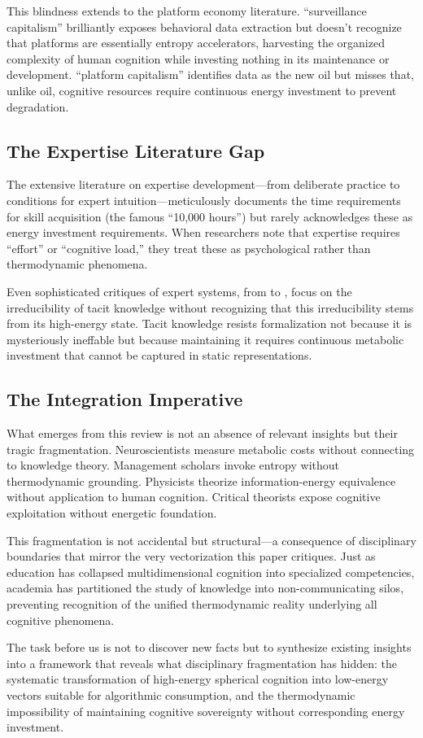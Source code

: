 This blindness extends to the platform economy literature. \citet{zuboff2019} ``surveillance capitalism'' brilliantly exposes behavioral data extraction but doesn't recognize that platforms are essentially entropy accelerators, harvesting the organized complexity of human cognition while investing nothing in its maintenance or development. \citet{srnicek2017} ``platform capitalism'' identifies data as the new oil but misses that, unlike oil, cognitive resources require continuous energy investment to prevent degradation.

\subsection{The Expertise Literature Gap}

The extensive literature on expertise development---from \citet{ericsson2006} deliberate practice to \citet{kahneman2009} conditions for expert intuition---meticulously documents the time requirements for skill acquisition (the famous ``10,000 hours'') but rarely acknowledges these as energy investment requirements. When researchers note that expertise requires ``effort'' or ``cognitive load,'' they treat these as psychological rather than thermodynamic phenomena.

Even sophisticated critiques of expert systems, from \citet{dreyfus1979} to \citet{collins2010}, focus on the irreducibility of tacit knowledge without recognizing that this irreducibility stems from its high-energy state. Tacit knowledge resists formalization not because it is mysteriously ineffable but because maintaining it requires continuous metabolic investment that cannot be captured in static representations.

\subsection{The Integration Imperative}

What emerges from this review is not an absence of relevant insights but their tragic fragmentation. Neuroscientists measure metabolic costs without connecting to knowledge theory. Management scholars invoke entropy without thermodynamic grounding. Physicists theorize information-energy equivalence without application to human cognition. Critical theorists expose cognitive exploitation without energetic foundation.

This fragmentation is not accidental but structural---a consequence of disciplinary boundaries that mirror the very vectorization this paper critiques. Just as education has collapsed multidimensional cognition into specialized competencies, academia has partitioned the study of knowledge into non-communicating silos, preventing recognition of the unified thermodynamic reality underlying all cognitive phenomena.

The task before us is not to discover new facts but to synthesize existing insights into a framework that reveals what disciplinary fragmentation has hidden: the systematic transformation of high-energy spherical cognition into low-energy vectors suitable for algorithmic consumption, and the thermodynamic impossibility of maintaining cognitive sovereignty without corresponding energy investment.
